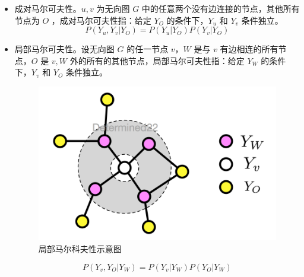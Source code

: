 \begin{itemize}
	\item 成对马尔可夫性。$u, v$ 为无向图 $G$ 中的任意两个没有边连接的节点，其他所有节点为 $O$ ，成对马尔可夫性指：给定 $Y_O$ 的条件下，$Y_u$ 和 $Y_v$ 条件独立。
	\begin{equation}
		P(Y_{u}, Y_{v} | Y_{O})=P\left(Y_{u} | Y_{O}\right) P\left(Y_{v} | Y_{O}\right)
	\end{equation}
	
	\item 局部马尔可夫性。设无向图 $G$ 的任一节点 $v$，$W$ 是与 $v$ 有边相连的所有节点，$O$ 是 $v, W$ 外的所有的其他节点，局部马尔可夫性指：给定 $Y_W$ 的条件下，$Y_v$ 和 $Y_O$ 条件独立。
	\begin{figure}[ht]
		\centering
		\includegraphics[width=\linewidth/2]{figures/Markov2.png}
		\caption{局部马尔科夫性示意图}
    	\label{fig:Markov2}
	\end{figure}
	\begin{equation}
		P\left(Y_{v}, Y_{O} | Y_{W}\right)=P\left(Y_{v} | Y_{W}\right) P\left(Y_{O} | Y_{W}\right)
	\end{equation}
	

\end{itemize}
